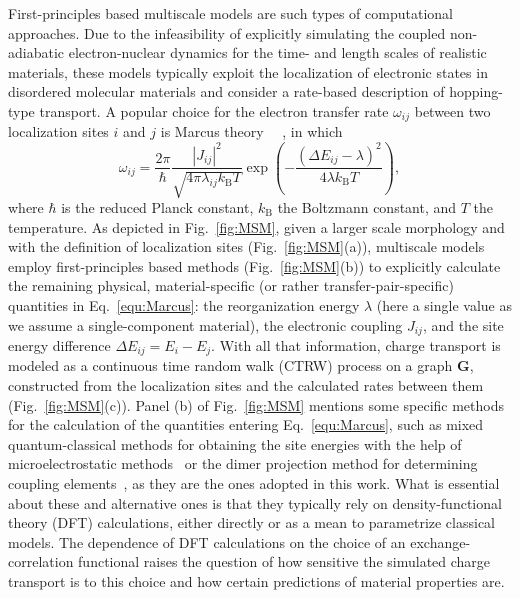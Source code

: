 \documentclass[%
 reprint,
superscriptaddress,
 amsmath,amssymb,
 aps,
prb,
floatfix
]{revtex4-2}
\newcommand{\bjoern}[2]{{\color{blue}{{\bf #1} #2}}}
\begin{document}
First-principles based multiscale models are such types of computational approaches. Due to the infeasibility of explicitly simulating the coupled non-adiabatic electron-nuclear dynamics for the time- and length scales of realistic materials, these models typically exploit the localization of electronic states in disordered molecular materials and consider a rate-based description of hopping-type transport. A popular choice for the electron transfer rate $\omega_{ij}$ between two localization sites $i$ and $j$ is Marcus theory~\cite{marcus_theory_1956, marcus_electron_1993}  ~\bjoern{add}{citation}, in which
%
\begin{equation}
    \omega_{ij} = \frac{2\pi}{\hbar} \frac{|J_{ij}|^2}{\sqrt{4\pi \lambda_{ij} k_\text{B}T}} \exp\left(-\frac{(\Delta E_{ij} - \lambda)^2}{4\lambda k_\text{B}T}\right) ,
    \label{equ:Marcus}
\end{equation}
%
where $\hbar$ is the reduced Planck constant,  $k_\text{B}$ the Boltzmann constant, and $T$ the temperature. As depicted in Fig.~\ref{fig:MSM}, given a larger scale morphology and with the definition of localization sites (Fig.~\ref{fig:MSM}(a)), multiscale models employ first-principles based methods (Fig.~\ref{fig:MSM}(b)) to explicitly calculate the remaining physical, material-specific (or rather transfer-pair-specific) quantities in Eq.~\ref{equ:Marcus}: the reorganization energy $\lambda$ (here a single value as we assume a single-component material), the electronic coupling $J_{ij}$, and the site energy difference $\Delta E_{ij} = E_i - E_j$. With all that information, charge transport is modeled as a continuous time random walk (CTRW) process on a graph $\mathbf{G}$, constructed from the localization sites and the calculated rates between them (Fig.~\ref{fig:MSM}(c)). Panel (b) of Fig.~\ref{fig:MSM} mentions some specific methods for the calculation of the quantities entering Eq.~\ref{equ:Marcus}, such as mixed quantum-classical methods for obtaining the site energies with the help of microelectrostatic methods~\cite{poelking_impact_2015, poelking_long-range_2016} \bjoern{add}{citations} or the dimer projection method for determining coupling elements~\cite{baumeier_density_2010}, as they are the ones adopted in this work. What is essential about these and alternative ones is that they typically rely on density-functional theory (DFT) calculations, either directly or as a mean to parametrize classical models. The dependence of DFT calculations on the choice of an exchange-correlation functional raises the question of how sensitive the simulated charge transport is to this choice and how certain predictions of material properties are. 
\end{document}

